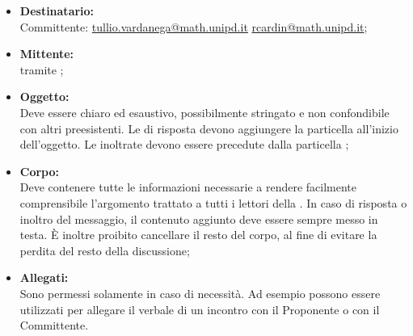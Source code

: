 \begin{itemize}
	\item \textbf{Destinatario:}
	\\Committente: \href{mailto:tullio.vardanega@math.unipd.it}{tullio.vardanega@math.unipd.it}{} \href{mailto:rcardin@math.unipd.it}{rcardin@math.unipd.it}{};
	\item \textbf{Mittente:}
	\\\Responsabile{} tramite \email{} \href{mailto:\GroupEmail}{\GroupEmail}{};
	\item \textbf{Oggetto:}
	\\Deve essere chiaro ed esaustivo, possibilmente stringato e non confondibile con altri preesistenti. Le \email{} di risposta devono aggiungere la particella  all’inizio dell’oggetto. Le \email{} inoltrate devono essere precedute dalla particella ;
	\item \textbf{Corpo:}
	\\Deve contenere tutte le informazioni necessarie a rendere facilmente comprensibile l’argomento trattato a tutti i lettori della \email{}. In caso di risposta o inoltro del messaggio, il contenuto aggiunto deve essere sempre messo in testa. È inoltre proibito cancellare il resto del corpo, al fine di evitare la perdita del resto della discussione;
	\item \textbf{Allegati:}
	\\Sono permessi solamente in caso di necessità. Ad esempio possono essere utilizzati per allegare il verbale di un incontro con il Proponente o con il Committente.
\end{itemize}

